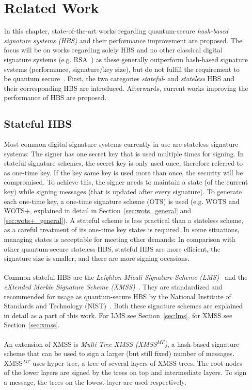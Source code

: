 \chapter{Related Work}
\label{cha:stateOfTheArt}

In this chapter, state-of-the-art works regarding quantum-secure \textit{hash-based signature systems (HBS)} and their performance improvement are proposed. 
The focus will be on works regarding solely HBS and no other classical digital signature systems (e.g. RSA~\cite{rsa_patent}) as these generally outperform hash-based signature systems (performance, signature/key size), but do not fulfill the requirement to be quantum secure~\cite{RSA_pq-attack_examples_2018,comparison_performance_RSA_ECDSA_Merkle_WOTS_2021}.
First, the two categories \textit{stateful}- and \textit{stateless} HBS and their corresponding HBS are introduced. Afterwards, current works improving the performance of HBS are proposed.

\section{Stateful HBS}
Most common digital signature systems currently in use are stateless signature systems: 
The signer has one secret key that is used multiple times for signing. In stateful signature schemes, the secret key is only used once, therefore referred to as one-time key. 
If the key same key is used more than once, the security will be compromised. 
To achieve this, the signer needs to maintain a state (of the current key) while signing messages (that is updated after every signature). To generate each one-time key, a one-time signature scheme (OTS) is used (e.g. WOTS and WOTS+, explained in detail in Section~\ref{sec:wots_general} and \ref{sec:wots+_general}).
A stateful scheme is less practical than a stateless scheme, as a careful treatment of its one-time key states is required. 
In some situations, managing states is acceptable for meeting other demands: In comparison with other quantum-secure stateless HBS, stateful HBS are more efficient, the signature size is smaller, and there are more signing occasions.~\cite{properties_stateless_HBS_2022}
\\ \\
Common stateful HBS are the \textit{Leighton-Micali Signature Scheme (LMS)}~\cite{LMS_RFC8554} and the \textit{eXtended Merkle Signature Scheme (XMSS)}~\cite{xmss_RFC8391}. They are standardized and recommended for usage as quantum-secure HBS by the National Institute of Standards and Technology (NIST)~\cite{stateful_hashbased_sign_schemes_NIST_2020}. Both these signature schemes are explained in detail as a part of this work. For LMS see Section~\ref{sec:lms}, for XMSS see Section~\ref{sec:xmss}.
\\ \\
An extension of XMSS is \textit{Multi Tree XMSS (XMSS$^{MT}$)}, a hash-based
signature scheme that can be used to sign a larger (but still fixed) number of messages.
XMSS$^{MT}$ uses hyper-tree, a tree of several layers of XMSS trees. The root nodes of the lower layers are signed by the trees on top and intermediate layers. To sign a message, the trees on the lowest layer are used respectively.~\cite{xmss_multitree_2013,xmss_RFC8391}

